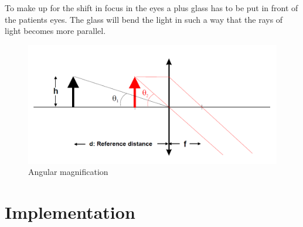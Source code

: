\documentclass[12pt,a4paper,notitlepage]{report}
\begin{document}
To make up for the shift in focus in the eyes a plus glass has to be put in front of the patients eyes. The glass will bend the light in such a way that the rays of light becomes more parallel. 

\begin{figure}[ht!]
\centering
\includegraphics[width=120mm]{images/Angular_magnification.png}
\caption{Angular magnification\label{theory}}
\end{figure}

\chapter{Implementation}






\end{document}
